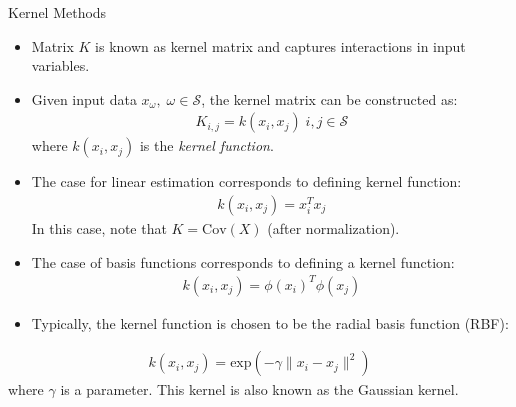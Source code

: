 \documentclass[handout,9pt]{beamer}
\begin{document}
\begin{frame}{Kernel Methods}
\begin{itemize}
\item Matrix $K$ is known as kernel matrix and captures interactions in input variables. 
\item Given input data $x_\omega,\; \omega \in \mathcal{S}$, the kernel matrix can be constructed as:
\begin{align*}
K_{i,j}=k(x_i,x_j)\; i,j\in \mathcal{S}
\end{align*}
where $k(x_i,x_j)$ is the {\em kernel function}. 
\item The case for linear estimation corresponds to defining kernel function:
\begin{align*}
k(x_i,x_j)=x_i^Tx_j
\end{align*}
In this case, note that $K=\textrm{Cov}(X)$ (after normalization). 
\item The case of basis functions corresponds to defining a kernel function:
\begin{align*}
k(x_i,x_j)=\phi(x_i)^T\phi(x_j)
\end{align*}
\item Typically, the kernel function is chosen to be the radial basis function (RBF):
\end{itemize}
\begin{align*}
k(x_i,x_j)=\textrm{exp}(-\gamma\|x_i-x_j\|^2)
\end{align*}
where $\gamma$ is a parameter. This kernel is also known as the Gaussian kernel.  
\end{frame}

\end{document}

